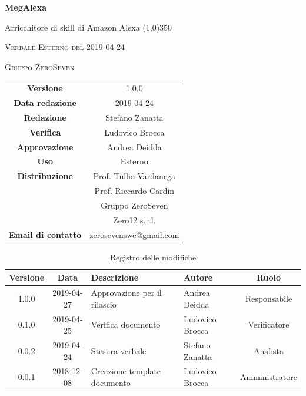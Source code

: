 \documentclass[a4paper,12pt]{article}
\author{Stefano Zanatta}
\date{2019-04-24}
\begin{document}
	\begin{titlepage}
		\centering
		{\huge\bfseries MegAlexa\par}
		Arricchitore di skill di Amazon Alexa
		\line(1,0){350} \\
		{\scshape\LARGE Verbale Esterno del 2019-04-24 \par}
		\vspace{1cm}
		{\scshape Gruppo ZeroSeven \par}
		\logo
		\begin{tabular}{c|c}
			{\hfill \textbf{Versione}} 			& 1.0.0			\\
			{\hfill\textbf{Data redazione}} 	& 2019-04-24\\ 
			{\hfill\textbf{Redazione}} 			&  Stefano Zanatta	\\ 
			{\hfill\textbf{Verifica}} 			&  	  Ludovico Brocca\\ 
			{\hfill\textbf{Approvazione}} 		&  	Andrea Deidda \\ 
			{\hfill\textbf{Uso}} 				& 	Esterno	\\ 
			{\hfill\textbf{Distribuzione}} 		& 	Prof. Tullio Vardanega \\ & Prof. Riccardo Cardin \\ & Gruppo ZeroSeven \\ & Zero12 s.r.l.	\\ 
			{\hfill\textbf{Email di contatto}} & zerosevenswe@gmail.com \\
		\end{tabular}
	\end{titlepage}
	
	
	
	\label{LastFrontPage}
	
	
	\newpage
	\cleardoublepage
	\begin{table}[tbph]
		\centering
		\begin{tabularx}{\textwidth}{|c|c|X|X|c|}
			\hline
			\textbf{Versione} & \textbf{Data} & \textbf{Descrizione} & \textbf{Autore} & \textbf{Ruolo} \\
			\hline
			1.0.0 & 2019-04-27 & Approvazione per il rilascio & Andrea Deidda & Responsabile \\
			\hline
			0.1.0 & 2019-04-25 & Verifica documento & Ludovico Brocca & Verificatore \\
			\hline
			0.0.2 & 2019-04-24 & Stesura verbale &Stefano Zanatta & Analista \\
			\hline
			0.0.1 & 2018-12-08 & Creazione template documento & Ludovico Brocca & Amministratore\\
			\hline
		\end{tabularx}
		\caption{Registro delle modifiche}
	\end{table}
	\cleardoublepage
	\pagestyle{mymain}
	
\end{document}
